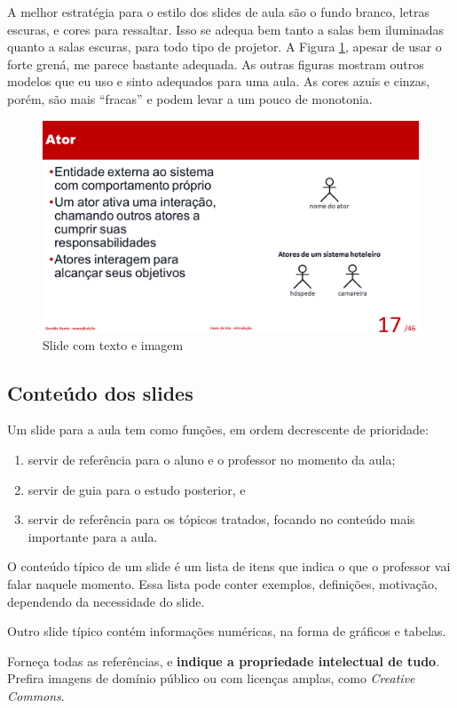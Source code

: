 A melhor estratégia para o estilo dos slides de aula são o fundo branco, letras escuras, e cores para ressaltar. Isso se adequa bem tanto a salas bem iluminadas quanto a salas escuras, para todo tipo de projetor. A Figura \ref{fig:teximag}, apesar de usar o forte grená, me parece bastante adequada. As outras figuras  mostram outros modelos que eu uso e sinto adequados para uma aula. As cores azuis e cinzas, porém, são mais ``fracas'' e podem levar a um pouco de monotonia.

\begin{figure}[hbt]
    \centering
    \includegraphics[width=\tam\linewidth,frame]{imagens/slidecomimage.png}
    \caption{Slide com texto e imagem}
    \label{fig:teximag}
\end{figure}

\subsection{Conteúdo dos slides}

Um slide para a aula tem como funções, em ordem decrescente de prioridade:
\begin{enumerate}
    \item servir de referência para o aluno e o professor no momento da aula;
    \item servir de guia para o estudo posterior, e
    \item servir de referência para os tópicos tratados, focando no conteúdo mais importante para a aula.
\end{enumerate}

O conteúdo típico de um slide é um lista de itens que indica o que o professor vai falar naquele momento. Essa lista pode conter exemplos, definições, motivação, dependendo da necessidade do slide.

Outro slide típico contém informações numéricas, na forma de gráficos e tabelas.

Forneça todas as referências, e \textbf{indique a propriedade intelectual de tudo}. Prefira imagens de domínio público ou com licenças amplas, como \textit{Creative Commons}.


